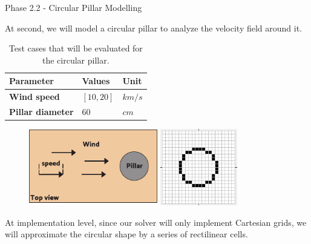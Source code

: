 \begin{frame}{Phase 2.2 - Circular Pillar Modelling}

    At second, we will model a circular pillar to analyze the velocity field around it.

    \begin{table}
        \centering
        \begin{tabular}{l|ll}
            Parameter                & Values     & Unit   \\
            \hline
            \textbf{Wind speed}      & $[10, 20]$ & $km/s$ \\
            \textbf{Pillar diameter} & $60$       & $cm$   \\
            \hline
        \end{tabular}
        \caption{Test cases that will be evaluated for the circular pillar.}
    \end{table}

    \begin{figure}
        \centering
        \includegraphics[width=0.5\textwidth]{pdf/Circular-pillar.pdf}
        \hspace{18pt}
        \includegraphics[width=0.3\textwidth]{img/Circular-approximation.png}
    \end{figure}

    At implementation level, since our solver will only implement Cartesian grids, we will approximate the circular shape by a series of rectilinear cells.

\end{frame}



